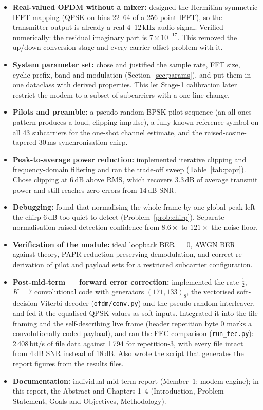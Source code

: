 \documentclass[11pt,a4paper]{report}
\begin{document}
\begin{itemize}
    \item \textbf{Real-valued OFDM without a mixer:} designed the Hermitian-symmetric
    IFFT mapping (QPSK on bins 22--64 of a 256-point IFFT), so the transmitter output
    is already a real 4--12\,kHz audio signal. Verified numerically: the residual
    imaginary part is $7\times10^{-17}$. This removed the up/down-conversion stage and
    every carrier-offset problem with it.
    \item \textbf{System parameter set:} chose and justified the sample rate, FFT size,
    cyclic prefix, band and modulation (Section~\ref{sec:params}), and put them in one
    dataclass with derived properties. This let Stage-1 calibration later restrict the
    modem to a subset of subcarriers with a one-line change.
    \item \textbf{Pilots and preamble:} a pseudo-random BPSK pilot sequence (an all-ones
    pattern produces a loud, clipping impulse), a fully-known reference symbol on all
    43 subcarriers for the one-shot channel estimate, and the raised-cosine-tapered
    30\,ms synchronisation chirp.
    \item \textbf{Peak-to-average power reduction:} implemented iterative clipping and
    frequency-domain filtering and ran the trade-off sweep
    (Table~\ref{tab:papr}). Chose clipping at 6\,dB above RMS, which recovers 3.3\,dB of
    average transmit power and still reaches zero errors from 14\,dB SNR.
    \item \textbf{Debugging:} found that normalising the whole frame by one global peak
    left the chirp 6\,dB too quiet to detect (Problem~\ref{prob:chirp}). Separate
    normalisation raised detection confidence from $8.6\times$ to $121\times$ the
    noise floor.
    \item \textbf{Verification of the module:} ideal loopback BER $=0$, AWGN BER against
    theory, PAPR reduction preserving demodulation, and correct re-derivation of pilot
    and payload sets for a restricted subcarrier configuration.
    \item \textbf{Post-mid-term --- forward error correction:} implemented the
    rate-$\tfrac12$, $K=7$ convolutional code with generators $(171,133)_8$, the
    vectorised soft-decision Viterbi decoder (\texttt{ofdm/conv.py}) and the
    pseudo-random interleaver, and fed it the equalised QPSK values as soft inputs.
    Integrated it into the file framing and the self-describing live frame (header
    repetition byte 0 marks a convolutionally coded payload), and ran the FEC
    comparison (\texttt{run\_fec.py}): 2\,408\,bit/s of file data against
    1\,794 for repetition-3, with every file intact from 4\,dB SNR instead of 18\,dB.
    Also wrote the script that generates the report figures from the results files.
    \item \textbf{Documentation:} individual mid-term report (Member~1: modem engine);
    in this report, the Abstract and Chapters 1--4 (Introduction, Problem Statement,
    Goals and Objectives, Methodology).
\end{itemize}
\end{document}
